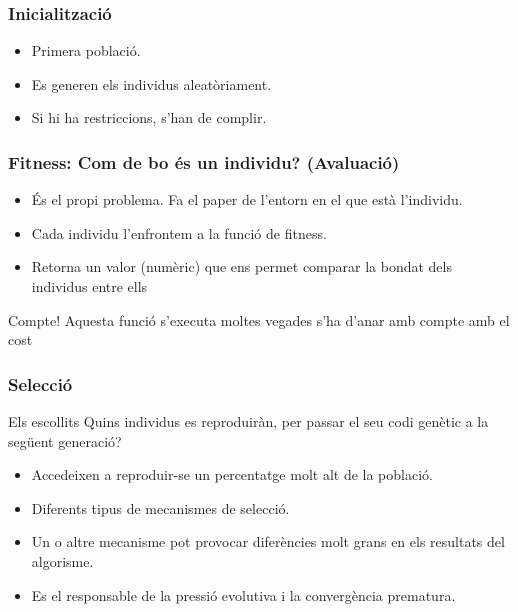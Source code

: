 \documentclass{beamer}
\begin{document}
\begin{frame}
	\frametitle{Inicialització}
		\begin{itemize}
			\item Primera població.
			\item Es generen els individus aleatòriament.
			\item Si hi ha restriccions, s'han de complir.
		\end{itemize}
\end{frame}

\begin{frame}
	\frametitle{Fitness: Com de bo és un individu? (Avaluació)} 
	\begin{itemize}
		\item És el propi problema.  Fa el paper de l'entorn en el que està
		l'individu.
		\item Cada individu l'enfrontem a la funció de fitness.
		\item Retorna un valor (numèric) que ens permet comparar la bondat dels
		individus entre ells
	\end{itemize}
	\pause
	\begin{alertblock}{Compte!}
		Aquesta funció s'executa moltes vegades s'ha d'anar amb compte amb el
		cost
	\end{alertblock}
\end{frame}

\begin{frame}
	\frametitle{Selecció}
		\begin{block}{Els escollits}
			Quins individus es reproduiràn, per passar el seu codi genètic a la següent
			generació?
		\end{block}
		\pause
		\begin{itemize}
			\item Accedeixen a reproduir-se un percentatge molt alt de la
			població.
			\item Diferents tipus de mecanismes de selecció.
			\item Un o altre mecanisme pot provocar diferències molt grans en
			els resultats del algorisme.
			\item Es el responsable de la pressió evolutiva i la convergència
			prematura.
		\end{itemize}
\end{frame}
\end{document}
